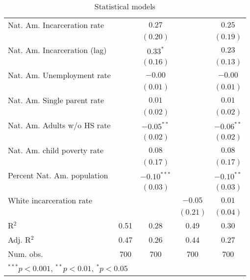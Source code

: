 \begin{table}
\begin{center}
\begin{tabular}{l c c c c }
Nat. Am. Incarceration rate  &             & $0.27$        &              & $0.25$       \\
                             &             & $(0.20)$      &              & $(0.19)$     \\
Nat. Am. Incarceration (lag) &             & $0.33^{*}$    &              & $0.23$       \\
                             &             & $(0.16)$      &              & $(0.13)$     \\
Nat. Am. Unemployment rate   &             & $-0.00$       &              & $-0.00$      \\
                             &             & $(0.01)$      &              & $(0.01)$     \\
Nat. Am. Single parent rate  &             & $0.01$        &              & $0.01$       \\
                             &             & $(0.02)$      &              & $(0.02)$     \\
Nat. Am. Adults w/o HS rate  &             & $-0.05^{**}$  &              & $-0.06^{**}$ \\
                             &             & $(0.02)$      &              & $(0.02)$     \\
Nat. Am. child poverty rate  &             & $0.08$        &              & $0.08$       \\
                             &             & $(0.17)$      &              & $(0.17)$     \\
Percent Nat. Am. population  &             & $-0.10^{***}$ &              & $-0.10^{**}$ \\
                             &             & $(0.03)$      &              & $(0.03)$     \\
White incarceration rate     &             &               & $-0.05$      & $0.01$       \\
                             &             &               & $(0.21)$     & $(0.04)$     \\
\hline
R$^2$                        & 0.51        & 0.28          & 0.49         & 0.30         \\
Adj. R$^2$                   & 0.47        & 0.26          & 0.44         & 0.27         \\
Num. obs.                    & 700         & 700           & 700          & 700          \\
\hline
\multicolumn{5}{l}{\scriptsize{$^{***}p<0.001$, $^{**}p<0.01$, $^*p<0.05$}}
\end{tabular}
\caption{Statistical models}
\label{table:coefficients}
\end{center}
\end{table}
